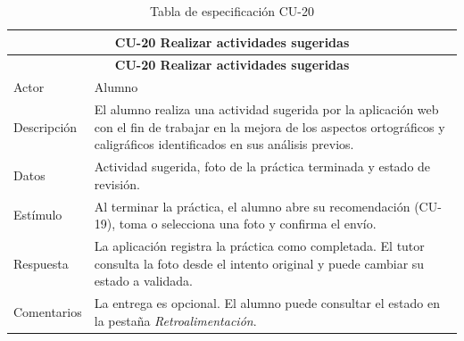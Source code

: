 \begin{longtable}{|p{4cm}|p{11cm}|}
\caption{Tabla de especificación CU-20}
\label{tab:cu20} \\

\hline
\multicolumn{2}{|c|}{\textbf{CU-20 Realizar actividades sugeridas}} \\
\hline
\endfirsthead

\hline
\multicolumn{2}{|c|}{\textbf{CU-20 Realizar actividades sugeridas}} \\
\hline
\endhead

\hline
\endfoot
\endlastfoot

Actor & Alumno \\
\hline

Descripción & El alumno realiza una actividad sugerida por la aplicación web con el fin de trabajar en la mejora de los aspectos ortográficos y caligráficos identificados en sus análisis previos. \\
\hline

Datos & Actividad sugerida, foto de la práctica terminada y estado de revisión. \\
\hline

Estímulo & Al terminar la práctica, el alumno abre su recomendación (CU-19), toma o selecciona una foto y confirma el envío. \\
\hline

Respuesta & La aplicación registra la práctica como completada. El tutor consulta la foto desde el intento original y puede cambiar su estado a validada. \\
\hline

Comentarios & La entrega es opcional. El alumno puede consultar el estado en la pestaña \textit{Retroalimentación}. \\
\hline

\end{longtable}

